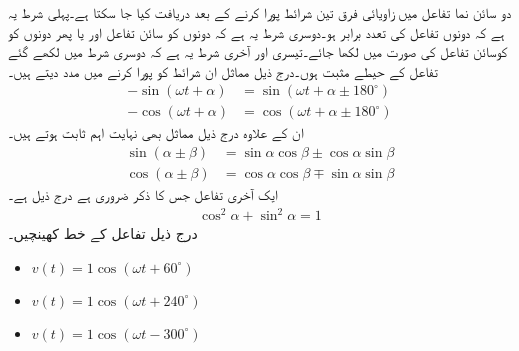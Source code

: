 دو سائن نما تفاعل میں زاویائی فرق  تین شرائط پورا کرنے کے بعد دریافت کیا جا سکتا ہے۔پہلی شرط یہ ہے کہ دونوں تفاعل کی تعدد برابر ہو۔دوسری شرط یہ ہے کہ دونوں کو  سائن تفاعل اور یا پھر دونوں کو  کوسائن تفاعل کی صورت میں لکھا جائے۔تیسری اور آخری شرط یہ ہے کہ دوسری شرط میں لکھے گئے تفاعل کے حیطے مثبت ہوں۔درج ذیل مماثل ان شرائط کو پورا کرنے میں مدد دیتے ہیں۔
\begin{align}
-\sin(\omega t+\alpha)&=\sin(\omega t+\alpha \pm 180^{\circ})\label{مساوات_بدلتا_آدھی_طول_منفی_موج_الف}\\
-\cos(\omega t+\alpha)&=\cos(\omega t+\alpha \pm 180^{\circ})\label{مساوات_بدلتا_آدھی_طول_منفی_موج_ب}
\end{align}
ان کے علاوہ درج ذیل مماثل بھی نہایت اہم ثابت ہوتے ہیں۔
\begin{align}
\sin(\alpha\pm\beta)&=\sin \alpha \cos \beta \pm \cos \alpha \sin \beta \label{مساوات_بدلتا_آدھی_طول_منفی_موج_پ}\\
\cos(\alpha \pm \beta)&=\cos \alpha \cos \beta \mp \sin \alpha \sin \beta \label{مساوات_بدلتا_آدھی_طول_منفی_موج_ت}
\end{align}
ایک آخری تفاعل جس کا ذکر ضروری ہے درج ذیل ہے۔
\begin{align} \label{مساوات_بدلتا_آدھی_طول_منفی_موج_ٹ}
\cos^2 \alpha+\sin^2 \alpha=1
\end{align}
درج ذیل تفاعل کے خط کھینچیں۔
\begin{itemize}
\item
$v(t)=1 \cos (\omega t +60^{\circ})$
\item
$v(t)=1 \cos (\omega t +240^{\circ})$
\item
$v(t)=1 \cos (\omega t -300^{\circ})$
\end{itemize}


